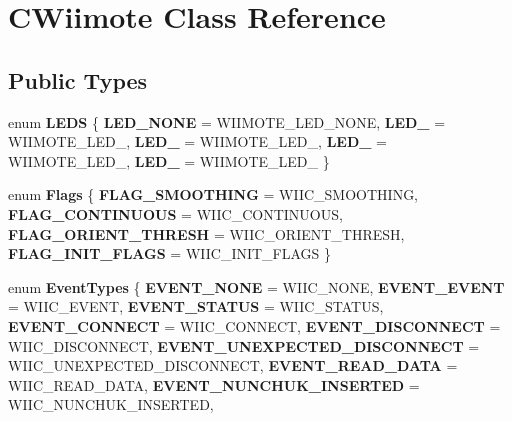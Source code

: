 \hypertarget{class_c_wiimote}{\section{\-C\-Wiimote \-Class \-Reference}
\label{class_c_wiimote}
}
\subsection*{\-Public \-Types}
\begin{DoxyCompactItemize}
\item 
enum {\bfseries \-L\-E\-D\-S} \{ \*
{\bfseries \-L\-E\-D\-\_\-\-N\-O\-N\-E} =  \-W\-I\-I\-M\-O\-T\-E\-\_\-\-L\-E\-D\-\_\-\-N\-O\-N\-E, 
{\bfseries \-L\-E\-D\-\_} =  \-W\-I\-I\-M\-O\-T\-E\-\_\-\-L\-E\-D\-\_, 
{\bfseries \-L\-E\-D\-\_} =  \-W\-I\-I\-M\-O\-T\-E\-\_\-\-L\-E\-D\-\_, 
{\bfseries \-L\-E\-D\-\_} =  \-W\-I\-I\-M\-O\-T\-E\-\_\-\-L\-E\-D\-\_, 
\*
{\bfseries \-L\-E\-D\-\_} =  \-W\-I\-I\-M\-O\-T\-E\-\_\-\-L\-E\-D\-\_
 \}
\item 
enum {\bfseries \-Flags} \{ {\bfseries \-F\-L\-A\-G\-\_\-\-S\-M\-O\-O\-T\-H\-I\-N\-G} =  \-W\-I\-I\-C\-\_\-\-S\-M\-O\-O\-T\-H\-I\-N\-G, 
{\bfseries \-F\-L\-A\-G\-\_\-\-C\-O\-N\-T\-I\-N\-U\-O\-U\-S} =  \-W\-I\-I\-C\-\_\-\-C\-O\-N\-T\-I\-N\-U\-O\-U\-S, 
{\bfseries \-F\-L\-A\-G\-\_\-\-O\-R\-I\-E\-N\-T\-\_\-\-T\-H\-R\-E\-S\-H} =  \-W\-I\-I\-C\-\_\-\-O\-R\-I\-E\-N\-T\-\_\-\-T\-H\-R\-E\-S\-H, 
{\bfseries \-F\-L\-A\-G\-\_\-\-I\-N\-I\-T\-\_\-\-F\-L\-A\-G\-S} =  \-W\-I\-I\-C\-\_\-\-I\-N\-I\-T\-\_\-\-F\-L\-A\-G\-S
 \}
\item 
enum {\bfseries \-Event\-Types} \{ \*
{\bfseries \-E\-V\-E\-N\-T\-\_\-\-N\-O\-N\-E} =  \-W\-I\-I\-C\-\_\-\-N\-O\-N\-E, 
{\bfseries \-E\-V\-E\-N\-T\-\_\-\-E\-V\-E\-N\-T} =  \-W\-I\-I\-C\-\_\-\-E\-V\-E\-N\-T, 
{\bfseries \-E\-V\-E\-N\-T\-\_\-\-S\-T\-A\-T\-U\-S} =  \-W\-I\-I\-C\-\_\-\-S\-T\-A\-T\-U\-S, 
{\bfseries \-E\-V\-E\-N\-T\-\_\-\-C\-O\-N\-N\-E\-C\-T} =  \-W\-I\-I\-C\-\_\-\-C\-O\-N\-N\-E\-C\-T, 
\*
{\bfseries \-E\-V\-E\-N\-T\-\_\-\-D\-I\-S\-C\-O\-N\-N\-E\-C\-T} =  \-W\-I\-I\-C\-\_\-\-D\-I\-S\-C\-O\-N\-N\-E\-C\-T, 
{\bfseries \-E\-V\-E\-N\-T\-\_\-\-U\-N\-E\-X\-P\-E\-C\-T\-E\-D\-\_\-\-D\-I\-S\-C\-O\-N\-N\-E\-C\-T} =  \-W\-I\-I\-C\-\_\-\-U\-N\-E\-X\-P\-E\-C\-T\-E\-D\-\_\-\-D\-I\-S\-C\-O\-N\-N\-E\-C\-T, 
{\bfseries \-E\-V\-E\-N\-T\-\_\-\-R\-E\-A\-D\-\_\-\-D\-A\-T\-A} =  \-W\-I\-I\-C\-\_\-\-R\-E\-A\-D\-\_\-\-D\-A\-T\-A, 
{\bfseries \-E\-V\-E\-N\-T\-\_\-\-N\-U\-N\-C\-H\-U\-K\-\_\-\-I\-N\-S\-E\-R\-T\-E\-D} =  \-W\-I\-I\-C\-\_\-\-N\-U\-N\-C\-H\-U\-K\-\_\-\-I\-N\-S\-E\-R\-T\-E\-D, 

\end{DoxyCompactItemize}
